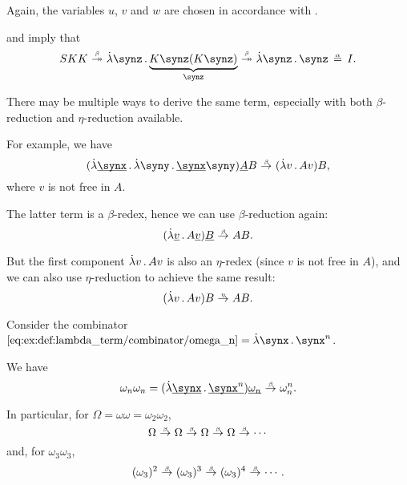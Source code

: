 \begin{example}
\begin{thmenum}
    Again, the variables \( u \), \( v \) and \( w \) are chosen in accordance with .

      and  imply that
    \begin{equation*}
      SKK \bred* \qabs \synz \underbrace{K \synz (K \synz)}_\synz \bred* \qabs \synz \synz \aequiv I.
    \end{equation*}

     There may be multiple ways to derive the same term, especially with both \( \beta \)-reduction and \( \eta \)-reduction available.

    For example, we have
    \begin{equation*}
      (\qabs {\hi{\synx}} \qabs \syny \hi{\synx} \syny) \hi{A} B \bred (\qabs v A v) B,
    \end{equation*}
    where \( v \) is not free in \( A \).

    The latter term is a \( \beta \)-redex, hence we can use \( \beta \)-reduction again:
    \begin{equation*}
      (\qabs {\hi{v}} A \hi{v}) \hi{B} \bred AB.
    \end{equation*}

    But the first component \( \qabs v A v \) is also an \( \eta \)-redex (since \( v \) is not free in \( A \)), and we can also use \( \eta \)-reduction to achieve the same result:
    \begin{equation*}
      (\qabs v A v) B \ered AB.
    \end{equation*}

     Consider the combinator \( \ref{eq:ex:def:lambda_term/combinator/omega_n} = \qabs \synx \synx^n \).

    We have
    \begin{equation*}
      \omega_n \omega_n
      =
      (\qabs {\hi{\synx}} \hi{\synx^n}) \hi{\omega_n}
      \bred
      \omega_n^n.
    \end{equation*}

    In particular, for \( \Omega = \omega \omega = \omega_2 \omega_2 \),
    \begin{equation*}
      \Omega \bred \Omega \bred \Omega \bred \Omega \bred \cdots
    \end{equation*}
    and, for \( \omega_3 \omega_3 \),
    \begin{equation*}
      (\omega_3)^2 \bred (\omega_3)^3 \bred (\omega_3)^4 \bred \cdots.
    \end{equation*}


\end{thmenum}
\end{example}
